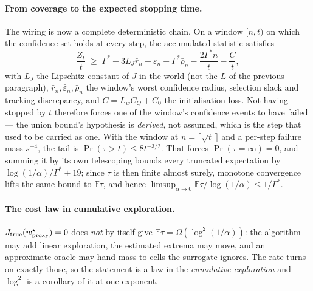 
\paragraph{From coverage to the expected stopping time.}
The wiring is now a complete deterministic chain. On a window $[n,t)$ on which the
confidence set holds at every step, the accumulated statistic satisfies
\[
\frac{Z_{t}}{t}\;\ge\;\Gamma^{*}-3L_{J}\bar r_{n}-\bar\varepsilon_{n}
-\Gamma^{*}\bar\rho_{n}-\frac{2\Gamma^{*}n}{t}-\frac{C}{t},
\]
with $L_{J}$ the Lipschitz constant of $J$ in the world (not the $L$ of the previous
paragraph), $\bar r_{n},\bar\varepsilon_{n},\bar\rho_{n}$ the window's worst confidence
radius, selection slack and tracking discrepancy, and $C=L_{w}C_{Q}+C_{0}$ the
initialisation loss. Not having stopped by $t$ therefore forces one of the window's
confidence events to have failed --- the union bound's hypothesis is \emph{derived}, not
assumed, which is the step that used to be carried as one. With the window at
$n=\lceil\sqrt t\,\rceil$ and a per-step failure mass $s^{-4}$, the tail is
$\Pr(\tau>t)\le 8t^{-3/2}$. That forces $\Pr(\tau=\infty)=0$, and summing it by its own
telescoping bounds every truncated expectation by $\log(1/\alpha)/\Gamma^{*}+19$; since
$\tau$ is then finite almost surely, monotone convergence lifts the same bound to
$\mathbb{E}\tau$, and hence
$\limsup_{\alpha\to0}\mathbb{E}\tau/\log(1/\alpha)\le1/\Gamma^{*}$.


\paragraph{The cost law in cumulative exploration.}
$J_{\rm true}(w^{\star}_{\rm proxy})=0$ does \emph{not} by itself give
$\mathbb{E}\tau=\Omega(\log^{2}(1/\alpha))$: the algorithm may add linear exploration, the
estimated extrema may move, and an approximate oracle may hand mass to cells the surrogate
ignores. The rate turns on exactly those, so the statement is a law in the
\emph{cumulative exploration} and $\log^{2}$ is a corollary of it at one exponent.

